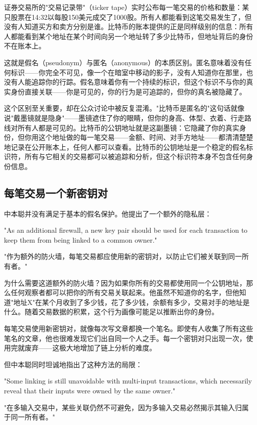 \documentclass[a4paper,12pt,openany]{ctexbook}
\newenvironment{quoting}{%
  \par\vspace{0.5em}%
  \begin{list}{}{%
    \setlength{\leftmargin}{2em}%
    \setlength{\rightmargin}{2em}%
    \setlength{\parsep}{0.3em}%
    \setlength{\itemsep}{0pt}%
    \setlength{\topsep}{0pt}%
  }%
  \item\relax
}{%
  \end{list}%
  \par\vspace{0.5em}%
}
\begin{document}
证券交易所的"交易记录带"（ticker tape）实时公布每一笔交易的价格和数量：某只股票在14:32以每股150美元成交了1000股。所有人都能看到这笔交易发生了，但没有人知道买方和卖方分别是谁。比特币的账本提供的正是同样级别的信息：所有人都能看到某个地址在某个时间向另一个地址转了多少比特币，但地址背后的身份不在账本上。

这就是假名（pseudonym）与匿名（anonymous）的本质区别。匿名意味着没有任何标识——你完全不可见，像一个在暗室中移动的影子，没有人知道你在那里，也没有人能追踪你的行踪。假名意味着你有一个持续的标识，但这个标识不与你的真实身份直接关联——你是可见的，你的行为是可追踪的，但你的真名被隐藏了。

这个区别至关重要，却在公众讨论中被反复混淆。"比特币是匿名的"这句话就像说"戴墨镜就是隐身"——墨镜遮住了你的眼睛，但你的身高、体型、衣着、行走路线对所有人都是可见的。比特币的公钥地址就是这副墨镜：它隐藏了你的真实身份，但你用这个地址做的每一笔交易——金额、时间、对手方地址——都清清楚楚地记录在公开账本上，任何人都可以查看。比特币的公钥地址是一个稳定的假名标识符，所有与它相关的交易都可以被追踪和分析，但这个标识符本身不包含任何身份信息。


\subsection*{每笔交易一个新密钥对}


中本聪并没有满足于基本的假名保护。他提出了一个额外的隐私层：


\begin{quoting}
\small
"As an additional firewall, a new key pair should be used for each transaction to keep them from being linked to a common owner."

"作为额外的防火墙，每笔交易都应使用新的密钥对，以防止它们被关联到同一所有者。"
\end{quoting}


为什么需要这道额外的防火墙？因为如果你所有的交易都使用同一个公钥地址，那么任何观察者都可以把你的所有交易关联起来。他虽然不知道你的名字，但他知道"地址X"在某个月收到了多少钱，花了多少钱，余额有多少，交易对手的地址是什么。随着交易数据的积累，这个行为画像可能足以推断出你的身份。

每笔交易使用新密钥对，就像每次写文章都换一个笔名。即使有人收集了所有这些笔名的文章，他也很难发现它们出自同一个人之手。每一个密钥对只出现一次，使用完就废弃——这极大地增加了链上分析的难度。

但中本聪同时坦诚地指出了这种方法的局限：


\begin{quoting}
\small
"Some linking is still unavoidable with multi-input transactions, which necessarily reveal that their inputs were owned by the same owner."

"在多输入交易中，某些关联仍然不可避免，因为多输入交易必然揭示其输入归属于同一所有者。"
\end{quoting}
\end{document}
